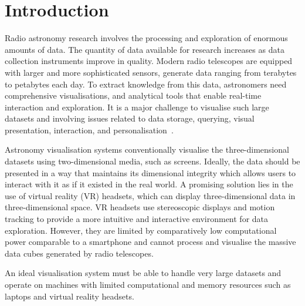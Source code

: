 \section{Introduction}
\label{sec:intro}


Radio astronomy research involves the processing and exploration of enormous amounts of data.
The quantity of data available for research increases as data collection instruments improve in quality.
Modern radio telescopes are equipped with larger and more sophisticated sensors, generate data ranging from terabytes to petabytes each day.
To extract knowledge from this data, astronomers need comprehensive visualisations, and analytical tools that enable real-time interaction and exploration.
It is a major challenge to visualise such large datasets and involving issues related to data storage, querying, visual presentation, interaction, and personalisation~\cite{Bikakis2018}.

Astronomy visualisation systems conventionally visualise the three-dimensional datasets using two-dimensional media, such as screens.
Ideally, the data should be presented in a way that maintains its dimensional integrity which allows users to interact with it as if it existed in the real world.
A promising solution lies in the use of virtual reality (VR) headsets, which can display three-dimensional data in three-dimensional space.
VR headsets use stereoscopic displays and motion tracking to provide a more intuitive and interactive environment for data exploration.
However, they are limited by comparatively low computational power comparable to a smartphone and cannot process and visualise the massive data cubes generated by radio telescopes.

An ideal visualisation system must be able to handle very large datasets and operate on machines with limited computational and memory resources such as laptops and virtual reality headsets.

